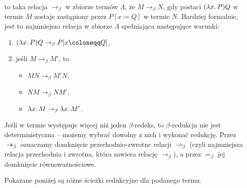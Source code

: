 \documentclass[polish,pretty]{angav}
\newcommand{\toto}{\twoheadrightarrow}
\begin{document}
 to taka relacja $\to_\beta$ w zbiorze termów $\Lambda$, że $M \to_\beta N$, gdy  postaci $(\lambda x\ldotp P)Q$ w termie $M$ zostaje zastąpiony przez $P[x \coloneqq Q]$ w termie $N$.
Bardziej formalnie, jest to najmniejsza relacja w zbiorze $\Lambda$ spełniająca następujące warunki:
\begin{enumerate}
    \item $(\lambda x\ldotp P)Q \to_\beta P[x \coloneqq Q]$,
    \item jeśli $M \to_\beta M'$, to
    \begin{itemize}[nosep]
        \item $MN \to_\beta M'N$,
        \item $NM \to_\beta NM'$,
        \item $\lambda x\ldotp M \to_\beta \lambda x\ldotp M'$.
    \end{itemize}
\end{enumerate}

Jeśli w termie występuje więcej niż jeden $\beta$-redeks, to $\beta$-redukcja nie jest deterministyczna -- możemy wybrać dowolny z nich i wykonać redukcję.
Przez $\toto_\beta$ oznaczamy domknięcie przechodnio-zwrotne relacji $\to_\beta$ (czyli najmniejsza relacja przechodnia i zwrotna, która zawiera relację $\to_\beta$), a przez $=_\beta$ jej domknięcie równoważnościowe.

\begin{example}
    \label{eq:beta-reduction}
    Pokazane poniżej są różne ścieżki redukcyjne dla podanego termu.
    \begin{center}
    \end{center}
\end{example}
\end{document}
